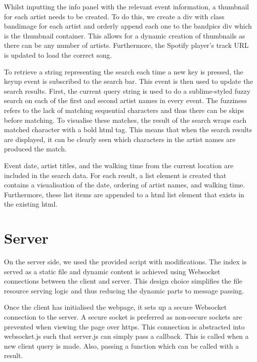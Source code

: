\documentclass[10pt]{article}
\begin{document}
            Whilst inputting the info panel with the relevant event information, a thumbnail for each artist needs to be created. To do this, we create a div with class bandimage for each artist and orderly append each one to the bandpics div which is the thumbnail container. This allows for a dynamic creation of thumbnails  as there can be any number of artists. Furthermore, the Spotify player's track URL is updated to load the correct song.

            To retrieve a string representing the search each time a new key is pressed, the keyup event is subscribed to the search bar. This event is then used to update the search results. First, the current query string is used to do a sublime-styled fuzzy search on each of the first and second artist names in every event. The fuzziness refers to the lack of matching sequential characters and thus there can be skips before matching. To visualise these matches, the result of the search wraps each matched character with a bold html tag. This means that when the search results are displayed, it can be clearly seen which characters in the artist names are produced the match.

            Event date, artist titles, and the walking time from the current location are included in the search data. For each result, a list element is created that contains a visualisation of the date, ordering of artist names, and walking time. Furthermore, these list items are appended to a html list element that exists in the existing html.

    \section{Server}
        On the server side, we used the provided script with modifications. The index is served as a static file and dynamic content is achieved using Websocket connections between the client and server. This design choice simplifies the file resource serving logic and thus reducing the dynamic parts to message passing.

        Once the client has initialised the webpage, it sets up a secure Websocket connection to the server. A secure socket is preferred as non-secure sockets are prevented when viewing the page over https. This connection is abstracted into websocket.js such that server.js can simply pass a callback.  This is called when a new client query is made. Also, passing a function which can be called with a result. 
\end{document}
